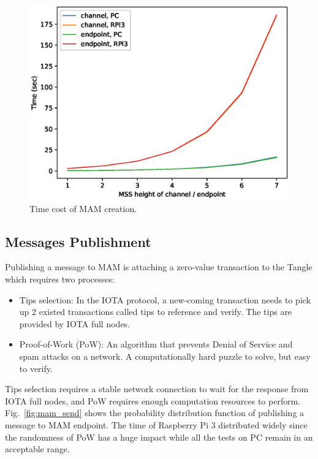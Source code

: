 \begin{spacing}{2.0}
\begin{figure}[h]
    \centering
    \includegraphics[width=5.in]{img/mam_create}
    \caption{Time cost of MAM creation.}
    \label{fig:mam_create}
\end{figure}

\subsection{Messages Publishment}
Publishing a message to MAM is attaching a zero-value transaction to the Tangle which requires two processes:
\begin{itemize}
    \item    Tips selection: In the IOTA protocol, a new-coming transaction needs to pick up 2 existed transactions called tips to reference and verify. The tips are provided by IOTA full nodes.
    \item    Proof-of-Work (PoW): An algorithm that prevents Denial of Service and spam attacks on a network. A computationally hard puzzle to solve, but easy to verify.
\end{itemize}

Tips selection requires a stable network connection to wait for the response from IOTA full nodes, and PoW requires enough computation resources to perform. Fig.~\ref{fig:mam_send} shows the probability distribution function of publishing a message to MAM endpoint. The time of Raspberry Pi 3 distributed widely since the randomness of PoW has a huge impact while all the tests on PC remain in an acceptable range.


\end{spacing}
